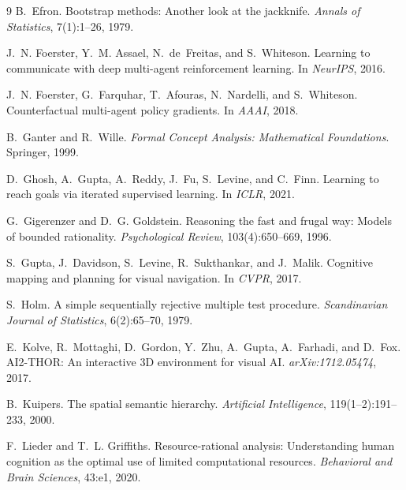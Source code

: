 \documentclass{article}
\begin{document}
{\begin{thebibliography}{9}
B.~Efron.
\newblock Bootstrap methods: Another look at the jackknife.
\newblock \emph{Annals of Statistics}, 7(1):1--26, 1979.

J.~N. Foerster, Y.~M. Assael, N.~de~Freitas, and S.~Whiteson.
\newblock Learning to communicate with deep multi-agent reinforcement learning.
\newblock In \emph{NeurIPS}, 2016.

J.~N. Foerster, G.~Farquhar, T.~Afouras, N.~Nardelli, and S.~Whiteson.
\newblock Counterfactual multi-agent policy gradients.
\newblock In \emph{AAAI}, 2018.

B.~Ganter and R.~Wille.
\newblock \emph{Formal Concept Analysis: Mathematical Foundations}.
\newblock Springer, 1999.

D.~Ghosh, A.~Gupta, A.~Reddy, J.~Fu, S.~Levine, and C.~Finn.
\newblock Learning to reach goals via iterated supervised learning.
\newblock In \emph{ICLR}, 2021.

G.~Gigerenzer and D.~G. Goldstein.
\newblock Reasoning the fast and frugal way: Models of bounded rationality.
\newblock \emph{Psychological Review}, 103(4):650--669, 1996.

S.~Gupta, J.~Davidson, S.~Levine, R.~Sukthankar, and J.~Malik.
\newblock Cognitive mapping and planning for visual navigation.
\newblock In \emph{CVPR}, 2017.

S.~Holm.
\newblock A simple sequentially rejective multiple test procedure.
\newblock \emph{Scandinavian Journal of Statistics}, 6(2):65--70, 1979.

E.~Kolve, R.~Mottaghi, D.~Gordon, Y.~Zhu, A.~Gupta, A.~Farhadi, and D.~Fox.
\newblock AI2-THOR: An interactive 3D environment for visual AI.
\newblock \emph{arXiv:1712.05474}, 2017.

B.~Kuipers.
\newblock The spatial semantic hierarchy.
\newblock \emph{Artificial Intelligence}, 119(1--2):191--233, 2000.

F.~Lieder and T.~L. Griffiths.
\newblock Resource-rational analysis: Understanding human cognition as the optimal use of limited computational resources.
\newblock \emph{Behavioral and Brain Sciences}, 43:e1, 2020.


\end{thebibliography}}
\end{document}
